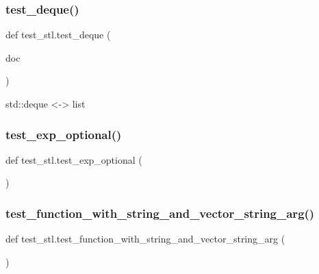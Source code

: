 \mbox{\label{namespacetest__stl_a1901fcf4767801c50d30f6b8c04d39f3}} 
\subsubsection{\texorpdfstring{test\_deque()}{test\_deque()}}
{\footnotesize\ttfamily def test\+\_\+stl.\+test\+\_\+deque (\begin{DoxyParamCaption}\item[{}]{doc }\end{DoxyParamCaption})}

\begin{DoxyVerb}std::deque <-> list\end{DoxyVerb}
 \mbox{\label{namespacetest__stl_a3f57738501f53b459692c0ca3324e088}} 
\subsubsection{\texorpdfstring{test\_exp\_optional()}{test\_exp\_optional()}}
{\footnotesize\ttfamily def test\+\_\+stl.\+test\+\_\+exp\+\_\+optional (\begin{DoxyParamCaption}{ }\end{DoxyParamCaption})}

\mbox{\label{namespacetest__stl_a7468ccf8a298b8d4562096923b90f314}} 
\subsubsection{\texorpdfstring{test\_function\_with\_string\_and\_vector\_string\_arg()}{test\_function\_with\_string\_and\_vector\_string\_arg()}}
{\footnotesize\ttfamily def test\+\_\+stl.\+test\+\_\+function\+\_\+with\+\_\+string\+\_\+and\+\_\+vector\+\_\+string\+\_\+arg (\begin{DoxyParamCaption}{ }\end{DoxyParamCaption})}

